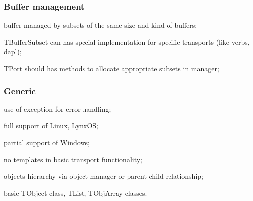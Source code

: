 \subsubsection{Buffer management}
\begin{compactitem}[$\bullet$]
\item buffer managed by subsets of the same size and kind of buffers;
\item TBufferSubset can has special implementation for specific transports (like verbs, dapl);
\item TPort should has methods to allocate appropriate subsets in manager;
\end{compactitem}
\subsubsection{Generic}
\begin{compactitem}[$\bullet$]
\item use of exception for error handling;
\item full support of Linux, LynxOS;
\item partial support of Windows;
\item no templates in basic transport functionality;
\item objects hierarchy via object manager or parent-child relationship;
\item basic TObject class, TList, TObjArray classes.
\end{compactitem}

